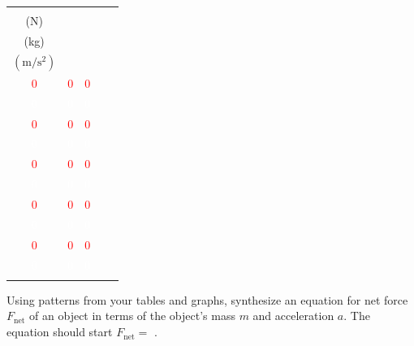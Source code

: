 \documentclass[]{exam}
\begin{document}
\begin{questions}
\begin{EnvUplevel}
\centering

\begin{minipage}{7.5cm}
\centering
\bgroup
\def\arraystretch{1.5}
\newcommand{\answertableentry}[3]{%
  \ifprintanswers
    \textcolor{red}{#1} & \textcolor{red}{#2} & \textcolor{red}{#3} \\ \hline
  \else
    \textcolor{white}{#1} & \textcolor{white}{#2} & \textcolor{white}{#3} \\ \hline
  \fi
}

\begin{tabular}{|c|c|c|c|c|}
  \hline
  \thead{\textbf{Net Force}, $F_\mathrm{net}$\\(N)} & \thead{\textbf{Mass}, $m$\\(kg)} & \thead{\textbf{Acceleration}, $a$\\$\left(\mathrm{m/s^2}\right)$}\\ \hline
  \answertableentry{0}{0}{0}
  \answertableentry{0}{0}{0}
  \answertableentry{0}{0}{0}
  \answertableentry{0}{0}{0}
  \answertableentry{0}{0}{0}
\end{tabular}
\egroup
\end{minipage}%
\hspace{5mm}
\begin{minipage}{6.5cm}
\centering
{}
\end{minipage}
\end{EnvUplevel}


\question
Using patterns from your tables and graphs, synthesize an equation for net force $F_{\mathrm{net}}$ of an object in terms of the object's mass $m$ and acceleration $a$. The equation should start $F_\mathrm{net} = $ \hfill .

\ifprintanswers
\else
\fillwithlines{7mm}
\fi

\end{questions}
\end{document}
